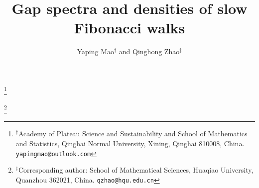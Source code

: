 \documentclass[11pt]{amsart}
\theoremstyle{definition}
\begin{document}
 
\raggedbottom
\makeatletter

\def\@settitle{%
  \begin{center}%
    \usefont{OT1}{cmr}{m}{n}%
    \fontsize{17.28pt}{21pt}\selectfont
    \@title
  \end{center}%
}

\patchcmd{\@setauthors}
  {\centering\footnotesize}
  {\centering
   \fontsize{12pt}{14.4pt}\selectfont}
  {}{}
\patchcmd{\@setauthors}
  {\MakeUppercase{\authors}}
  {\authors}
  {}{}

\def\@seccntformat#1{%
  \protect\textup{%
    \protect\bfseries
    \csname the#1\endcsname
    \protect\quad
  }%
}

\renewcommand{\section}{\@startsection{section}{1}%
  {\z@}%
  {.7\linespacing\@plus\linespacing}%
  {.5\linespacing}%
  {\usefont{OT1}{cmr}{bx}{n}%
   \fontsize{14.4pt}{17pt}\selectfont
   \raggedright}}

\makeatother\title{Gap spectra and densities of slow Fibonacci walks}

\author{Yaping Mao$^{\dagger}$ and Qinghong Zhao$^{\ddagger}$}

\thanks{$^{\dagger}$Academy of Plateau Science and Sustainability and
School of Mathematics and Statistics, Qinghai Normal University,
Xining, Qinghai 810008, China. \texttt{yapingmao@outlook.com}}

\thanks{$^{\ddagger}$Corresponding author: School of Mathematical
Sciences, Huaqiao University, Quanzhou 362021, China.
\texttt{qzhao@hqu.edu.cn}}

\date{}
\end{document}
